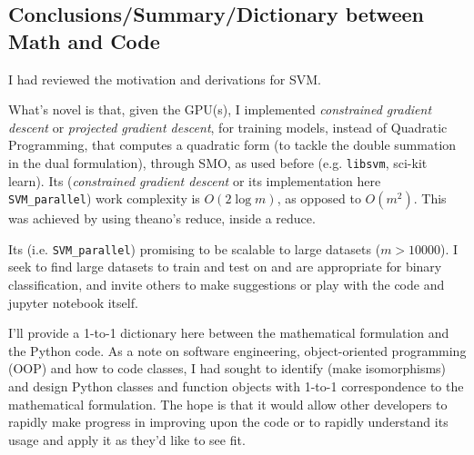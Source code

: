 \documentclass[10pt]{amsart}
\begin{document}
\begin{multicols*}{2}
\subsection{Conclusions/Summary/Dictionary between Math and Code}\label{Sec:ConclusionsSummary}

I had reviewed the motivation and derivations for SVM.

What's novel is that, given the GPU(s), I implemented \emph{constrained gradient descent} or \emph{projected gradient descent}, for training models, instead of Quadratic Programming, that computes a quadratic form (to tackle the double summation in the dual formulation), through SMO, as used before (e.g. \verb|libsvm|, sci-kit learn).  Its (\emph{constrained gradient descent} or its implementation here \verb|SVM_parallel|) work complexity is $O(2\log{m})$, as opposed to $O(m^2)$.  This was achieved by using theano's reduce, inside a reduce.  

Its (i.e. \verb|SVM_parallel|) promising to be scalable to large datasets ($m>10000$).  I seek to find large datasets to train and test on and are appropriate for binary classification, and invite others to make suggestions or play with the code and jupyter notebook itself.

I'll provide a 1-to-1 dictionary here between the mathematical formulation and the Python code.  As a note on software engineering, object-oriented programming (OOP) and how to code classes, I had sought to identify (make isomorphisms) and design Python classes and function objects with 1-to-1 correspondence to the mathematical formulation.  The hope is that it would allow other developers to rapidly make progress in improving upon the code or to rapidly understand its usage and apply it as they'd like to see fit.  


\end{multicols*}
\end{document}
